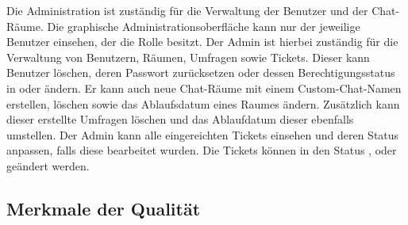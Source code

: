 \noindent
Die Administration ist zuständig für die Verwaltung der Benutzer und der Chat-Räume.
Die graphische Administrationsoberfläche kann nur der jeweilige Benutzer einsehen, der die Rolle  besitzt.
Der Admin ist hierbei zuständig für die Verwaltung von Benutzern, Räumen, Umfragen sowie Tickets.
Dieser kann Benutzer löschen, deren Passwort zurücksetzen oder dessen Berechtigungsstatus in  oder  ändern.
Er kann auch neue Chat-Räume mit einem Custom-Chat-Namen erstellen, löschen sowie das Ablaufsdatum eines Raumes ändern.
Zusätzlich kann dieser erstellte Umfragen löschen und das Ablaufdatum dieser ebenfalls umstellen.
Der Admin kann alle eingereichten Tickets einsehen und deren Status anpassen, falls diese bearbeitet wurden.
Die Tickets können in den Status , oder  geändert werden.

\subsection{Merkmale der Qualität}

